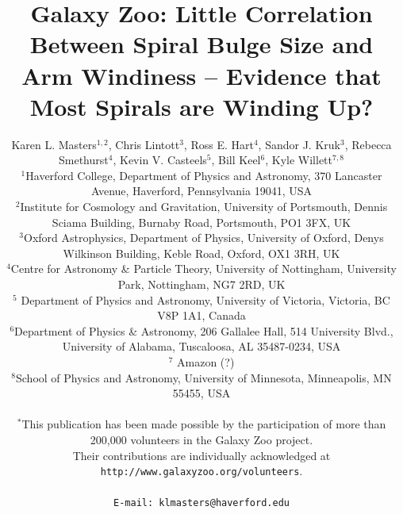 \documentclass[usenatbib]{mn2e}
\newcommand{\etal}{{\it et al.}}
\begin{document}
\title[Galaxy Zoo: Spirals Windiness and Bulge Size]{Galaxy Zoo: Little Correlation Between Spiral Bulge Size and Arm Windiness -- Evidence that Most Spirals are Winding Up?}
\author[K.L. Masters \etal]{Karen L. Masters$^{1,2}$, Chris Lintott$^{3}$, Ross E. Hart$^{4}$, Sandor J. Kruk$^{3}$, \newauthor Rebecca Smethurst$^{4}$,  Kevin V. Casteels$^5$, Bill Keel$^6$, Kyle Willett$^{7,8}$  \\
$^1$Haverford College, Department of Physics and Astronomy, 370 Lancaster Avenue, Haverford, Pennsylvania 19041, USA\\
$^2$Institute for Cosmology and Gravitation, University of Portsmouth, Dennis Sciama Building, Burnaby Road, Portsmouth, PO1 3FX, UK \\
 $^{3}$Oxford Astrophysics, Department of Physics, University of Oxford, Denys Wilkinson Building, Keble Road, Oxford, OX1 3RH, UK\\
  $^4$Centre for Astronomy \& Particle Theory, University of Nottingham, University Park, Nottingham, NG7 2RD, UK\\
 $^5$ Department of Physics and Astronomy, University of Victoria, Victoria, BC V8P 1A1, Canada\\
 $^6$Department of Physics \& Astronomy, 206 Gallalee Hall, 514 University Blvd., University of Alabama, Tuscaloosa, AL 35487-0234, USA\\
 $^7$ Amazon (?)\\ 
 $^8$School of Physics and Astronomy, University of Minnesota, Minneapolis, MN 55455, USA\\
\\
 $^*$This publication has been made possible by the participation of more than 200,000 volunteers in the Galaxy Zoo project. \\ Their contributions are individually acknowledged at \texttt{http://www.galaxyzoo.org/volunteers}. \\
\\
{\tt E-mail: klmasters@haverford.edu}
 }

 

\maketitle
\end{document}

